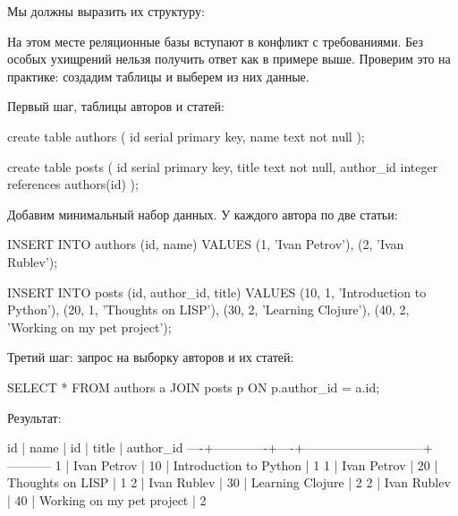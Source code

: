 Мы должны выразить их структуру:

\begin{english}
  \begin{clojure}
  \end{clojure}
\end{english}

На этом месте реляционные базы вступают в конфликт с требованиями. Без особых ухищрений нельзя получить ответ как в примере выше. Проверим это на практике: создадим таблицы и выберем из них данные.

Первый шаг, таблицы авторов и статей:

\begin{english}
  \begin{sql}
create table authors (
  id serial primary key,
  name text not null
);

create table posts (
  id serial primary key,
  title text not null,
  author_id integer references authors(id)
);
  \end{sql}
\end{english}

Добавим минимальный набор данных. У каждого автора по две статьи:

\begin{english}
  \begin{sql}
INSERT INTO authors (id, name) VALUES
  (1, 'Ivan Petrov'),
  (2, 'Ivan Rublev');

INSERT INTO posts (id, author_id, title) VALUES
  (10, 1, 'Introduction to Python'),
  (20, 1, 'Thoughts on LISP'),
  (30, 2, 'Learning Clojure'),
  (40, 2, 'Working on my pet project');
  \end{sql}
\end{english}

Третий шаг: запрос на выборку авторов и их статей:

\begin{english}
  \begin{sql}
SELECT *
FROM authors a
JOIN posts p ON p.author_id = a.id;
  \end{sql}
\end{english}

Результат:

\begin{english}
  \begin{text}
 id |    name     | id |            title            | author_id
----+-------------+----+-----------------------------+-----------
  1 | Ivan Petrov | 10 | Introduction to Python      |         1
  1 | Ivan Petrov | 20 | Thoughts on LISP            |         1
  2 | Ivan Rublev | 30 | Learning Clojure            |         2
  2 | Ivan Rublev | 40 | Working on my pet project   |         2
  \end{text}
\end{english}

